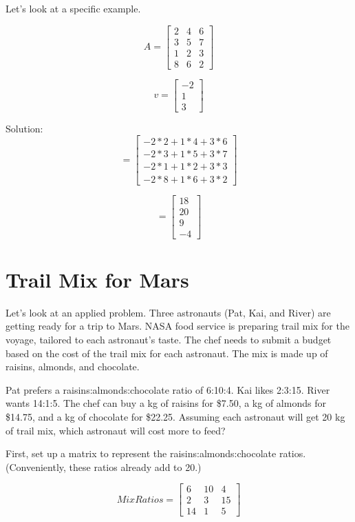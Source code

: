 Let's look at a specific example.

$$A = \begin{bmatrix}
 2  & 4 & 6  \\
 3  & 5 & 7  \\
 1  & 2 & 3  \\
 8  & 6 & 2 
\end{bmatrix}$$

$$v = \begin{bmatrix}
 -2 \\
 1 \\
 3 
\end{bmatrix}$$

Solution:
$$= \begin{bmatrix}
-2*2+1*4+3*6\\
-2*3+1*5+3*7\\
-2*1+1*2+3*3\\
-2*8+1*6+3*2
\end{bmatrix}$$

$$= \begin{bmatrix}
18 \\
20\\
9\\
-4 
\end{bmatrix}$$

\section{Trail Mix for Mars}
Let's look at an applied problem. Three astronauts (Pat, Kai, and River) are getting ready for a trip to Mars. NASA food service is preparing trail mix for the voyage, tailored to each astronaut's taste. The chef needs to submit a budget based on the cost of the trail mix for each astronaut. The mix is made up of raisins, almonds, and chocolate.

Pat prefers a raisins:almonds:chocolate ratio of 6:10:4. Kai likes 2:3:15. River wants 14:1:5. The chef can buy a kg of raisins for \$7.50, a kg of almonds for \$14.75, and a kg of chocolate for \$22.25. Assuming each astronaut will get 20 kg of trail mix, which astronaut will cost more to feed?

First, set up a matrix to represent the raisins:almonds:chocolate ratios. (Conveniently, these ratios already add to 20.)

$$MixRatios = \begin{bmatrix}
6 & 10 & 4  \\
2 & 3 & 15 \\
14 & 1 & 5
\end{bmatrix}$$

